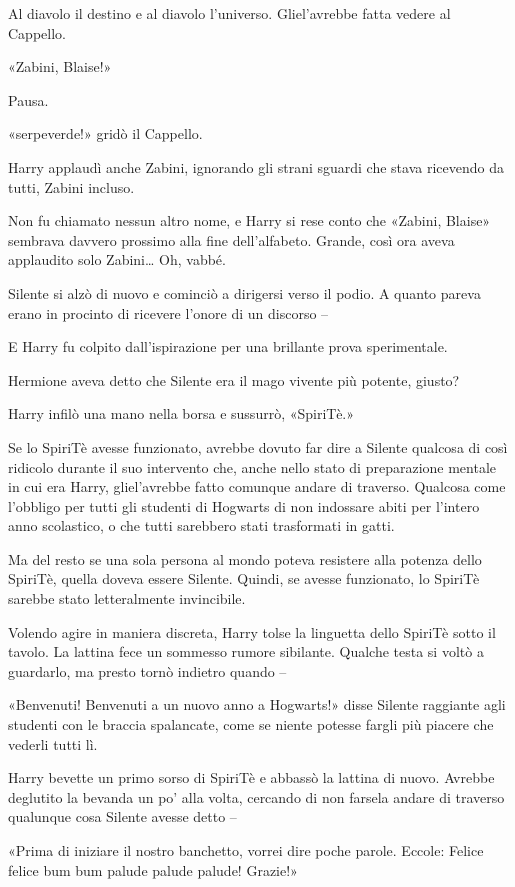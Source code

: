 Al diavolo il destino e al diavolo l’universo. Gliel’avrebbe fatta vedere al Cappello.

«Zabini, Blaise!»

Pausa.

«serpeverde!» gridò il Cappello.

Harry applaudì anche Zabini, ignorando gli strani sguardi che stava ricevendo da tutti, Zabini incluso.

Non fu chiamato nessun altro nome, e Harry si rese conto che «Zabini, Blaise» sembrava davvero prossimo alla fine dell’alfabeto. Grande, così ora aveva applaudito solo Zabini… Oh, vabbé.

Silente si alzò di nuovo e cominciò a dirigersi verso il podio. A quanto pareva erano in procinto di ricevere l’onore di un discorso –

E Harry fu colpito dall’ispirazione per una brillante prova sperimentale.

Hermione aveva detto che Silente era il mago vivente più potente, giusto?

Harry infilò una mano nella borsa e sussurrò, «SpiriTè.»

Se lo SpiriTè avesse funzionato, avrebbe dovuto far dire a Silente qualcosa di così ridicolo durante il suo intervento che, anche nello stato di preparazione mentale in cui era Harry, gliel’avrebbe fatto comunque andare di traverso. Qualcosa come l’obbligo per tutti gli studenti di Hogwarts di non indossare abiti per l’intero anno scolastico, o che tutti sarebbero stati trasformati in gatti.

Ma del resto se una sola persona al mondo poteva resistere alla potenza dello SpiriTè, quella doveva essere Silente. Quindi, se avesse funzionato, lo SpiriTè sarebbe stato letteralmente invincibile.

Volendo agire in maniera discreta, Harry tolse la linguetta dello SpiriTè sotto il tavolo. La lattina fece un sommesso rumore sibilante. Qualche testa si voltò a guardarlo, ma presto tornò indietro quando –

«Benvenuti! Benvenuti a un nuovo anno a Hogwarts!» disse Silente raggiante agli studenti con le braccia spalancate, come se niente potesse fargli più piacere che vederli tutti lì.

Harry bevette un primo sorso di SpiriTè e abbassò la lattina di nuovo. Avrebbe deglutito la bevanda un po’ alla volta, cercando di non farsela andare di traverso qualunque cosa Silente avesse detto –

«Prima di iniziare il nostro banchetto, vorrei dire poche parole. Eccole: Felice felice bum bum palude palude palude! Grazie!»

